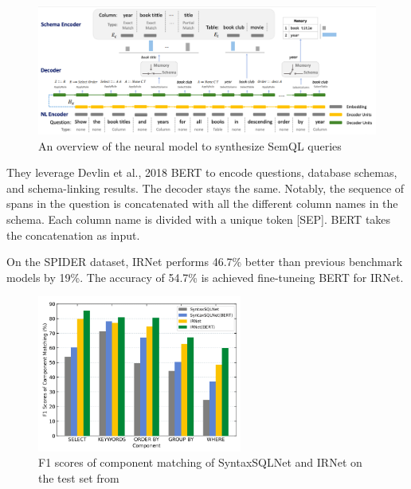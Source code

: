 \begin{figure}[H]
    \centering
    \includegraphics[width=1\textwidth]{pics/IRNet/overview}
    \caption{An overview of the neural model to synthesize SemQL queries\cite{DBLP:journals/corr/abs-1905-08205}}
    \label{fig:overview}
\end{figure}

They leverage Devlin et al., 2018 BERT\cite{devlin-etal-2019-bert} to encode questions, database schemas, and schema-linking results. The decoder stays the same. Notably, the sequence of spans in the question is concatenated with all the different column names in the schema. Each column name is divided with a unique token [SEP]. BERT takes the concatenation as input.

On the SPIDER dataset, IRNet performs 46.7\% better than previous benchmark models by 19\%. The accuracy of 54.7\% is achieved fine-tuneing BERT for IRNet.

\begin{figure}[H]
    \centering
    \includegraphics[width=0.6\textwidth]{pics/IRNet/f1}
    \caption{F1 scores of component matching of SyntaxSQLNet and IRNet on the test set from \cite{DBLP:journals/corr/abs-1905-08205}}
    \label{fig:f1}
\end{figure}
